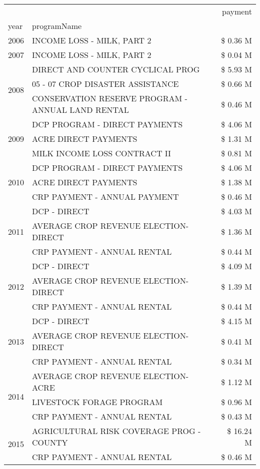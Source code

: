 \begin{tabular}{llr}
\toprule
 &  & payment \\
year & programName &  \\
\midrule
2006 & INCOME LOSS - MILK, PART 2 & \$ 0.36 M \\
\cline{1-3}
2007 & INCOME LOSS - MILK, PART 2 & \$ 0.04 M \\
\cline{1-3}
\multirow[t]{3}{*}{2008} & DIRECT AND COUNTER CYCLICAL PROG & \$ 5.93 M \\
 & 05 - 07 CROP DISASTER ASSISTANCE & \$ 0.66 M \\
 & CONSERVATION RESERVE PROGRAM - ANNUAL LAND RENTAL & \$ 0.46 M \\
\cline{1-3}
\multirow[t]{3}{*}{2009} & DCP PROGRAM - DIRECT PAYMENTS & \$ 4.06 M \\
 & ACRE DIRECT PAYMENTS & \$ 1.31 M \\
 & MILK INCOME LOSS CONTRACT II & \$ 0.81 M \\
\cline{1-3}
\multirow[t]{3}{*}{2010} & DCP PROGRAM - DIRECT PAYMENTS & \$ 4.06 M \\
 & ACRE DIRECT PAYMENTS & \$ 1.38 M \\
 & CRP PAYMENT - ANNUAL PAYMENT & \$ 0.46 M \\
\cline{1-3}
\multirow[t]{3}{*}{2011} & DCP - DIRECT & \$ 4.03 M \\
 & AVERAGE CROP REVENUE ELECTION-DIRECT & \$ 1.36 M \\
 & CRP PAYMENT - ANNUAL RENTAL & \$ 0.44 M \\
\cline{1-3}
\multirow[t]{3}{*}{2012} & DCP - DIRECT & \$ 4.09 M \\
 & AVERAGE CROP REVENUE ELECTION-DIRECT & \$ 1.39 M \\
 & CRP PAYMENT - ANNUAL RENTAL & \$ 0.44 M \\
\cline{1-3}
\multirow[t]{3}{*}{2013} & DCP - DIRECT & \$ 4.15 M \\
 & AVERAGE CROP REVENUE ELECTION-DIRECT & \$ 0.41 M \\
 & CRP PAYMENT - ANNUAL RENTAL & \$ 0.34 M \\
\cline{1-3}
\multirow[t]{3}{*}{2014} & AVERAGE CROP REVENUE ELECTION-ACRE & \$ 1.12 M \\
 & LIVESTOCK FORAGE PROGRAM & \$ 0.96 M \\
 & CRP PAYMENT - ANNUAL RENTAL & \$ 0.43 M \\
\cline{1-3}
\multirow[t]{3}{*}{2015} & AGRICULTURAL RISK COVERAGE PROG - COUNTY & \$ 16.24 M \\
 & CRP PAYMENT - ANNUAL RENTAL & \$ 0.46 M \\

\end{tabular}
